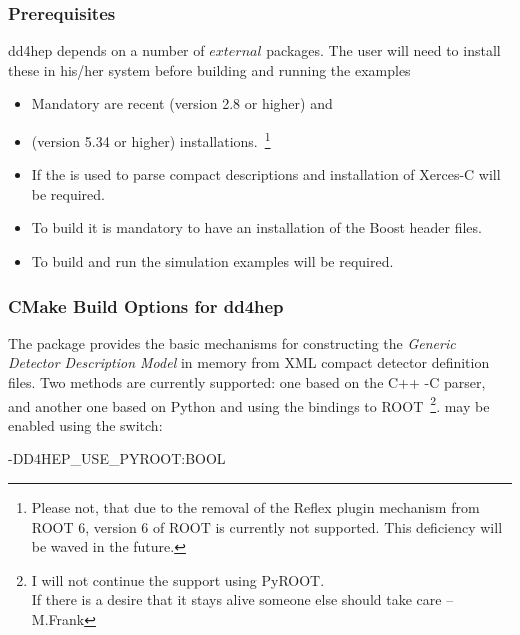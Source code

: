 \documentclass[10pt,a4paper]{article}
\begin{document}
\subsubsection{Prerequisites}
\label{sec:dd4hep-user-manual-prerequisites}
\noindent
dd4hep depends on a number of $external$ packages. 
The user will need to install these in his/her 
system before building and running the examples
\begin{itemize}\itemcompact
\item Mandatory are recent  (version 2.8 or higher) and 
\item {} (version 5.34 or higher) installations.~\footnote{Please 
not, that due to the removal of the Reflex plugin mechanism from ROOT 6,
version 6 of ROOT is currently not supported. This deficiency will be waved 
in the future.}
\item If the  is used to parse compact descriptions and 
        installation of {Xerces-C} will be required.
\item To build \DDG it is mandatory to have an installation of the Boost
    header files.
\item To build and run the simulation examples  will be required. 
\end{itemize}

\newpage
\subsubsection{CMake Build Options for dd4hep}
\label{sec:dd4hep-user-manual-building}
\noindent
The package provides the basic mechanisms for constructing the 
{\it{Generic Detector Description Model}} in memory from XML compact detector 
definition files. Two methods are currently supported: one based
on the C++ -C parser, and another one based on Python and using the 
 bindings to ROOT~\footnote{I will not continue 
the support using PyROOT. \\
If there is a desire that it stays alive 
someone else should take care -- M.Frank}. 
 may be enabled using the switch:

\begin{unnumberedcode}
    -DD4HEP_USE_PYROOT:BOOL
\end{unnumberedcode}
\end{document}
